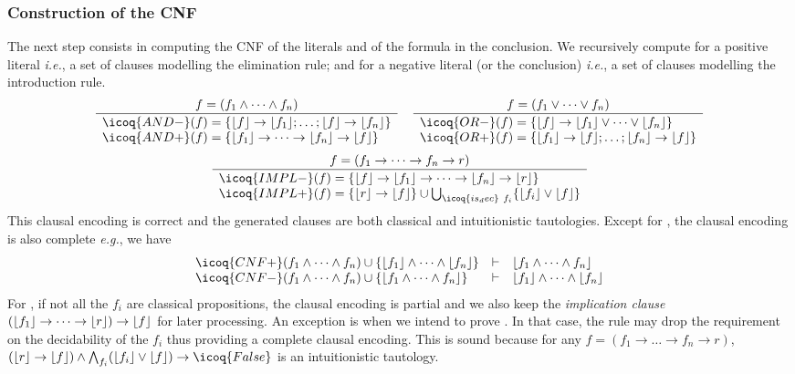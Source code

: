 \documentclass[utf8,a4paper,UKenglish,cleveref, autoref, thm-restate]{lipics-v2021}
\begin{document}
\subsubsection{Construction of the CNF}
The next step consists in computing the CNF of the literals and of the
formula in the conclusion.  We recursively compute for a positive literal
 \emph{i.e.}, a set of clauses modelling the elimination rule; and for a
negative literal (or the conclusion)  \emph{i.e.}, a set of clauses
modelling the introduction rule.
\[
  \begin{array}{cc}
    \dfrac{ f = (f_1 \land \dots \land f_n) }
    {
    \begin{array}{l}
      \icoq{AND-}(f) = \{\Lit{f} \to \Lit{f_1}; \dots; \Lit{f} \to \Lit{f_n}\}  \\
      \icoq{AND+}(f) = \{\Lit{f_1} \to \dots \to \Lit{f_n} \to \Lit{f} \}
    \end{array}} &
                   \dfrac{ f = (f_1 \lor \dots \lor f_n) }
                   {
                   \begin{array}{l}
                   \icoq{OR-}(f)=\{\Lit{f} \to \Lit{f_1} \lor \dots \lor \Lit{f_n}\}\\
                     \icoq{OR+}(f)=\{\Lit{f_1} \to  \Lit{f} ;  \ldots ; \Lit{f_n} \to \Lit{f}\}               
                   \end{array}
    }
  \end{array}
\]
\[
  \dfrac{ f = (f_1 \to \dots \to f_n \to r) }
  {
    \begin{array}{l}    
      \icoq{IMPL-}(f)= \{\Lit{f} \to \Lit{f_1} \to \dots \to \Lit{f_n} \to \Lit{r}\} \\
      \icoq{IMPL+}(f)= \{\Lit{r} \to \Lit{f}\} \cup  \bigcup_{\icoq{is_dec}\ f_i} \{\Lit{f_i} \lor \Lit{f}\}
    \end{array}
    }
  \]
This clausal encoding is correct and the generated clauses are both classical and intuitionistic tautologies.
Except for , the clausal encoding is also complete \emph{e.g.}, we have
\[
\begin{array}{lcl}
  \icoq{CNF+}(f_1\land \dots \land f_n) \cup \{ \Lit{f_1} \land \dots \land \Lit{f_n} \}   &\vdash& \Lit{f_1\land \dots \land f_n}\\
  \icoq{CNF-}(f_1\land \dots \land f_n) \cup \{ \Lit{f_1 \land \dots \land  f_n} \}  &\vdash& \Lit{f_1} \land \dots \land \Lit{f_n}\\
\end{array}
\]
%
For , if not all the $f_i$ are classical propositions, the
clausal encoding is partial and we also keep the \emph{implication
  clause} $(\lfloor f_1 \rfloor \to \dots \to \lfloor r \rfloor) \to \lfloor f \rfloor$ for later processing.  An
exception is when we intend to prove .  In that case, the
 rule may drop the requirement on the decidability of the
$f_i$ thus providing a complete clausal encoding.
This is sound because for any $f=(f_1 \to \dots \to f_n \to r)$,
$
  (\Lit{r} \to \Lit{f}) \land \bigwedge_{f_i} (\Lit{f_i} \lor \Lit{f}) \to \icoq{False}
$
is an intuitionistic tautology.%
\end{document}
